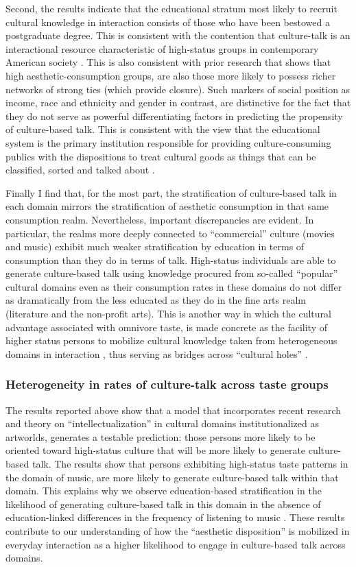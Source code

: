 \documentclass[11pt]{article}
\begin{document}
Second, the results indicate that the educational stratum most likely to recruit cultural knowledge in interaction consists of those who have been bestowed a postgraduate degree. This is consistent with the contention that culture-talk is an interactional resource characteristic of high-status groups in contemporary American society \citep{collins04}. This is also consistent with prior research that shows that high aesthetic-consumption groups, are also those more likely to possess richer networks of strong ties (which provide closure).  Such markers of social position as income, race and ethnicity and gender in contrast, are distinctive for the fact that they do not serve as powerful differentiating factors in predicting the propensity of culture-based talk. This is consistent with the view that the educational system is the primary institution responsible for providing culture-consuming publics with the dispositions to treat cultural goods as things that can be classified, sorted and talked about \cite{bourdieu93b, dimaggio00}.  

Finally I find that, for the most part, the stratification of culture-based talk in each domain mirrors the stratification of aesthetic consumption in that same consumption realm. Nevertheless, important discrepancies are evident. In particular, the realms more deeply connected to ``commercial'' culture (movies and music) exhibit much weaker stratification by education in terms of consumption than they do in terms of talk.  High-status individuals are able to generate culture-based talk using knowledge procured from so-called ``popular'' cultural domains even as their consumption rates in these domains do not differ as dramatically from the less educated as they do in the fine arts realm (literature and the non-profit arts). This is another way in which the cultural advantage associated with omnivore taste, is made concrete as the facility of higher status persons to mobilize cultural knowledge taken from heterogeneous domains in interaction \citep{ollivier08}, thus serving as bridges across ``cultural holes'' \citep{lizardo06a, pachuki_breiger10}.

\subsubsection{Heterogeneity in rates of culture-talk across taste groups}
The results reported above show that a model that incorporates recent research and theory on ``intellectualization'' in cultural domains institutionalized as artworlds, generates a testable prediction: those persons more likely to be oriented toward high-status culture that will be more likely to generate culture-based talk. The results show that persons exhibiting high-status taste patterns in the domain of music, are more likely to generate culture-based talk within that domain.  This explains why we observe education-based stratification in the likelihood of generating culture-based talk in this domain in the absence of education-linked differences in the frequency of listening to music \citep{denora00}. These results contribute to our understanding of how the ``aesthetic disposition'' is mobilized in everyday interaction as a higher likelihood to engage in culture-based talk across domains. 
\end{document}
